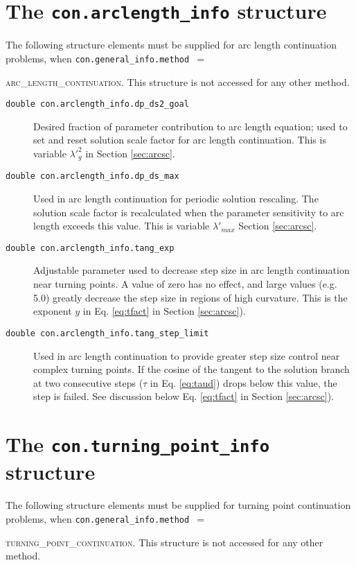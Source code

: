 \section{The \texttt{con.arclength\_info} structure}
\label{sec:cai}

The following structure elements must be supplied for arc length continuation problems, when \texttt{con.general\_info.method $=$}{\textsc{arc\_length\_continuation}. This structure is not accessed for any other method.

\begin{description}
\item[\texttt{double con.arclength\_info.dp\_ds2\_goal}] Desired fraction of parameter contribution to arc length equation; used to set and reset solution scale factor for arc length continuation. This is variable $\lambda'^2_g$ in Section \ref{sec:arcsc}.
\item[\texttt{double con.arclength\_info.dp\_ds\_max}] Used in arc length continuation for periodic solution rescaling. The solution scale factor is recalculated when the parameter sensitivity to arc length exceeds this value. This is variable $\lambda'_{max}$ Section \ref{sec:arcsc}.
\item[\texttt{double con.arclength\_info.tang\_exp}] Adjustable parameter used to decrease step size in arc length continuation near turning points. A value of zero has no effect, and large values (e.g. 5.0) greatly decrease the step size in regions of high curvature. This is the exponent $y$ in Eq. \ref{eq:tfact} in Section \ref{sec:arcsc}).
\item[\texttt{double con.arclength\_info.tang\_step\_limit}] Used in arc length continuation to provide greater step size control near complex turning points. If the cosine of the tangent to the solution branch at two consecutive steps ($\tau$ in Eq. \ref{eq:taud}) drops below this value, the step is failed. See discussion below Eq. \ref{eq:tfact} in Section \ref{sec:arcsc}).
\end{description}

\section{The \texttt{con.turning\_point\_info} structure}

The following structure elements must be supplied for turning point continuation problems, when \texttt{con.general\_info.method $=$}{\textsc{turning\_point\_continuation}. This structure is not accessed for any other method.

}}
